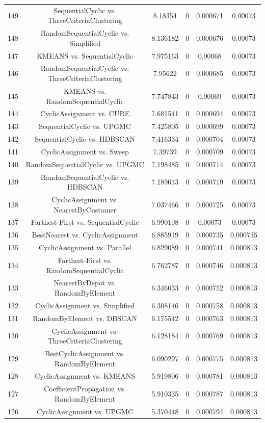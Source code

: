 \documentclass[a4paper,10pt]{article}
\begin{document}
\begin{landscape}
\begin{table}[!htp]
\begin{tabular}{cccccc}
149&SequentialCyclic vs. ThreeCriteriaClustering&8.18354&0&0.000671&0.00073\\
148&RandomSequentialCyclic vs. Simplified&8.136182&0&0.000676&0.00073\\
147&KMEANS vs. SequentialCyclic&7.975163&0&0.00068&0.00073\\
146&RandomSequentialCyclic vs. ThreeCriteriaClustering&7.95622&0&0.000685&0.00073\\
145&KMEANS vs. RandomSequentialCyclic&7.747843&0&0.00069&0.00073\\
144&CyclicAssignment vs. CURE&7.681541&0&0.000694&0.00073\\
143&SequentialCyclic vs. UPGMC&7.425805&0&0.000699&0.00073\\
142&SequentialCyclic vs. HDBSCAN&7.416334&0&0.000704&0.00073\\
141&CyclicAssignment vs. Sweep&7.39739&0&0.000709&0.00073\\
140&RandomSequentialCyclic vs. UPGMC&7.198485&0&0.000714&0.00073\\
139&RandomSequentialCyclic vs. HDBSCAN&7.189013&0&0.000719&0.00073\\
138&CyclicAssignment vs. NearestByCustomer&7.037466&0&0.000725&0.00073\\
137&Farthest-First vs. SequentialCyclic&6.990108&0&0.00073&0.00073\\
136&BestNearest vs. CyclicAssignment&6.885919&0&0.000735&0.000735\\
135&CyclicAssignment vs. Parallel&6.829089&0&0.000741&0.000813\\
134&Farthest-First vs. RandomSequentialCyclic&6.762787&0&0.000746&0.000813\\
133&NearestByDepot vs. RandomByElement&6.346033&0&0.000752&0.000813\\
132&CyclicAssignment vs. Simplified&6.308146&0&0.000758&0.000813\\
131&RandomByElement vs. DBSCAN&6.175542&0&0.000763&0.000813\\
130&CyclicAssignment vs. ThreeCriteriaClustering&6.128184&0&0.000769&0.000813\\
129&BestCyclicAssignment vs. RandomByElement&6.090297&0&0.000775&0.000813\\
128&CyclicAssignment vs. KMEANS&5.919806&0&0.000781&0.000813\\
127&CoefficientPropagation vs. RandomByElement&5.910335&0&0.000787&0.000813\\
126&CyclicAssignment vs. UPGMC&5.370448&0&0.000794&0.000813\\

\end{tabular}
\end{table}
\end{landscape}
\end{document}
